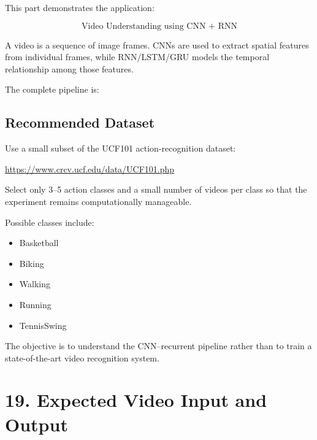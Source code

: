 \documentclass[10pt]{article}
\begin{document}
This part demonstrates the application:

\[
\boxed{\text{Video Understanding using CNN + RNN}}
\]

A video is a sequence of image frames. CNNs are used to extract spatial
features from individual frames, while RNN/LSTM/GRU models the temporal
relationship among those features.

The complete pipeline is:

\begin{center}
\end{center}

\subsection*{Recommended Dataset}

Use a small subset of the UCF101 action-recognition dataset:

\url{https://www.crcv.ucf.edu/data/UCF101.php}

Select only 3--5 action classes and a small number of videos per class so that
the experiment remains computationally manageable.

Possible classes include:

\begin{itemize}
\item Basketball
\item Biking
\item Walking
\item Running
\item TennisSwing
\end{itemize}

The objective is to understand the CNN--recurrent pipeline rather than to
train a state-of-the-art video recognition system.

\section*{19. Expected Video Input and Output}
\end{document}
